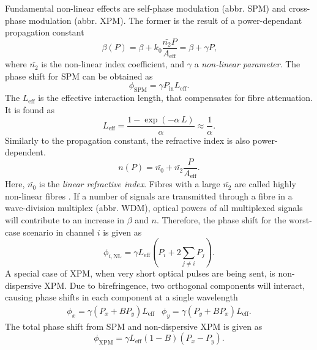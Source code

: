 \documentclass{standalone}
\begin{document}
Fundamental non-linear effects are self-phase modulation (abbr. SPM) and cross-phase modulation (abbr. XPM). The former is the result of a power-dependant propagation constant
\begin{equation}
\beta(P) = \beta + k_0 \frac{\bar{n_2} P}{A_\textrm{eff}} = \beta + \gamma P \textrm{,}
\end{equation}
where $\bar{n_2}$ is the non-linear index coefficient, and $\gamma$ a \textit{non-linear parameter}. The phase shift for SPM can be obtained as
\begin{equation}
\phi_\textrm{SPM} = \gamma P_\textrm{in} L_\textrm{eff} \textrm{.}
\end{equation}
The $L_\textrm{eff}$ is the effective interaction length, that compensates for fibre attenuation. It is found as
\begin{equation} \label{eq:leff}
L_\textrm{eff} = \frac{1 - \exp\left(-\alpha \, L\right)}{\alpha} \approx \frac{1}{\alpha} \textrm{.}
\end{equation}
Similarly to the propagation constant, the refractive index is also power-dependent.
\begin{equation}
n(P) = \bar{n_0} + \bar{n_2} \frac{P}{A_\textrm{eff}} \textrm{.}
\end{equation}
Here, $\bar{n_0}$ is the \textit{linear refractive index}. Fibres with a large $\bar{n_2}$ are called highly non-linear fibres \cite{Hiroishi2003}. If a number of signals are transmitted through a fibre in a wave-division multiplex (abbr. WDM), optical powers of all multiplexed signals will contribute to an increase in $\beta$ and $n$. Therefore, the phase shift for the worst-case scenario in channel $i$ is given as
\begin{equation}
\phi_{i,\textrm{NL}} = \gamma L_\textrm{eff} \left( P_i + 2 \sum_{j\ne i} P_j \right) \textrm{.}
\end{equation}
A special case of XPM, when very short optical pulses are being sent, is non-dispersive XPM. Due to birefringence, two orthogonal components will interact, causing phase shifts in each component at a single wavelength
\begin{eqnarray}
\phi_x = \gamma \left(P_x + B P_y\right) L_\textrm{eff} & \phi_y = \gamma \left( P_y + B P_x \right) L_\textrm{eff} \textrm{.}
\end{eqnarray}
The total phase shift from SPM and non-dispersive XPM is given as
\begin{equation}
\phi_\textrm{XPM} = \gamma L_\textrm{eff} \left(1 - B\right) \left(P_x - P_y\right) \textrm{.}
\end{equation} \\
\end{document}
